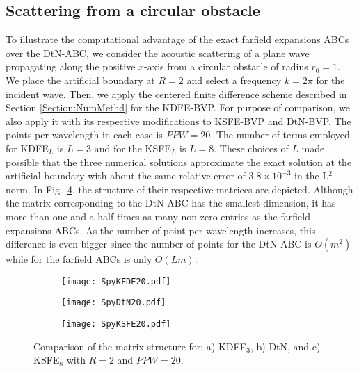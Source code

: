 \documentclass[final,3p,times,12pt]{elsarticle}
\begin{document}
\subsection{Scattering from a circular obstacle}\label{ScattCircle}
To illustrate the computational advantage of the exact farfield expansions ABCs over the DtN-ABC, we consider the acoustic scattering of a plane wave propagating along the positive $x$-axis from a circular obstacle of radius $r_0=1$. We place the artificial boundary at $R=2$ and select a frequency $k=2\pi$  for the incident wave.  Then, we apply the centered finite difference scheme described in Section \ref{Section:NumMethd} for the KDFE-BVP. For purpose of comparison, we also apply it with its respective modifications to KSFE-BVP and DtN-BVP.  The points per wavelength in each case is $PPW=20$. The number of terms employed for KDFE$_L$ is $L=3$ and for the KSFE$_L$ is $L=8$. These choices of $L$ made possible that the three numerical solutions approximate the exact solution at the artificial boundary with about the same relative error of $3.8 \times 10^{-3}$ in the L$^2$-norm. In Fig.~\ref{SpyGraph}, the structure of their respective matrices are depicted. Although the matrix corresponding to the DtN-ABC has the smallest dimension, it has more than one and a half times as many non-zero entries as the farfield expansions ABCs. As the number of point per wavelength increases, this difference is even bigger since the number of points for the DtN-ABC is $O(m^2)$ while for the farfield ABCs is only $O(Lm)$. 

\begin{figure}[h!]
\begin{center}
\begin{subfigure}{0.32\textwidth}
\texttt{[image: SpyKFDE20.pdf]}
\caption{}
\label{SpyKDFE20}
\end{subfigure}
\begin{subfigure}{0.32\textwidth}
\texttt{[image: SpyDtN20.pdf]} 
\caption{}
\label{SpyDtN20}
\end{subfigure}
\begin{subfigure}{0.32\textwidth}
\texttt{[image: SpyKSFE20.pdf]}
\caption{}
\label{SpyKSFE20}
\end{subfigure}
\caption{Comparison of the matrix structure for: a) KDFE$_3$, b) DtN, and c) KSFE$_8$ with $R=2$ and $PPW =20$.}
\label{SpyGraph}
\end{center}
\end{figure}
\end{document}
